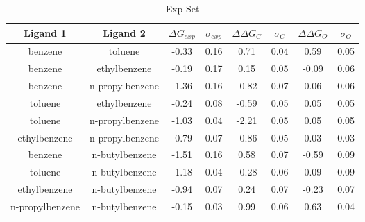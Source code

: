 \documentclass[T4paper.tex]{subfiles}
\begin{document}
\begin{table}[]
\centering
\caption{Exp Set}
\label{tbl:exp_set}
\begin{tabular}{|c|c|c|c|c|c|c|c|}
\hline
\textbf{Ligand 1} & \textbf{Ligand 2}  & \boldmath$\Delta G_{exp}$  & \boldmath$\sigma_{exp}$ & {\color[HTML]{800080} \boldmath$\Delta\Delta G_{C}$} & {\color[HTML]{800080} \boldmath$\sigma_{C}$} & {\color[HTML]{008000} \boldmath$\Delta\Delta G_{O}$} & {\color[HTML]{008000} \boldmath$\sigma_{O}$} \\ \hline
benzene         & toluene         & -0.33        & 0.16            & 0.71       & 0.04          & 0.59       & 0.05          \\ \hline
benzene         & ethylbenzene    & -0.19        & 0.17            & 0.15       & 0.05          & -0.09      & 0.06          \\ \hline
benzene         & n-propylbenzene & -1.36        & 0.16            & -0.82      & 0.07          & 0.06       & 0.06          \\ \hline
toluene         & ethylbenzene    & -0.24        & 0.08            & -0.59      & 0.05          & 0.05       & 0.05          \\ \hline
toluene         & n-propylbenzene & -1.03        & 0.04            & -2.21      & 0.05          & 0.05       & 0.05          \\ \hline
ethylbenzene    & n-propylbenzene & -0.79        & 0.07            & -0.86      & 0.05          & 0.03       & 0.03          \\ \hline
benzene         & n-butylbenzene  & -1.51        & 0.16            & 0.58       & 0.07          & -0.59      & 0.09          \\ \hline
toluene         & n-butylbenzene  & -1.18        & 0.04            & -0.28      & 0.06          & 0.09       & 0.09          \\ \hline
ethylbenzene    & n-butylbenzene  & -0.94        & 0.07            & 0.24       & 0.07          & -0.23      & 0.07          \\ \hline
n-propylbenzene & n-butylbenzene  & -0.15        & 0.03            & 0.99       & 0.06          & 0.63       & 0.04          \\ \hline
\end{tabular}
\end{table}
\end{document}
